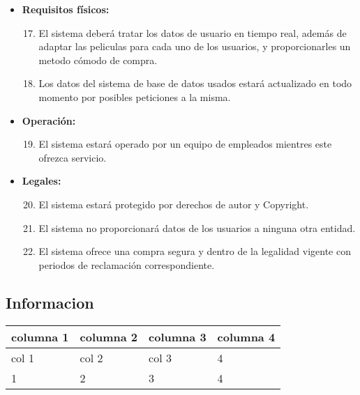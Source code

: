 \documentclass{article}
\begin{document}
\begin{itemize}
    \item \textbf{Requisitos físicos:}
        \begin{enumerate}[label=\bfseries RN- \arabic*:]
        \setcounter{enumi}{16}
        \item El sistema deberá tratar los datos de usuario en tiempo real, además de adaptar las peliculas para cada uno de los usuarios, y proporcionarles un metodo cómodo de compra.
        \item Los datos del sistema de base de datos usados estará actualizado en todo momento por posibles peticiones a la misma.
        \end{enumerate}
        
    \item \textbf{Operación:}
        \begin{enumerate}[label=\bfseries RN- \arabic*:]
        \setcounter{enumi}{18}
        \item El sistema estará operado por un equipo de empleados mientres este ofrezca servicio.
        \end{enumerate}
        
    \item \textbf{Legales:}
        \begin{enumerate}[label=\bfseries RN- \arabic*:]
        \setcounter{enumi}{19}
        \item El sistema estará protegido por derechos de autor y Copyright.
        \item El sistema no proporcionará datos de los usuarios a ninguna otra entidad.
        \item El sistema ofrece una compra segura y dentro de la legalidad vigente con periodos de reclamación correspondiente.
        \end{enumerate}
    \end{itemize}
    \subsection{Informacion}




\begin{tabular}{||l | l | l | l ||}
\hline
\hline
columna 1 & columna 2 & columna 3 & columna 4\\
\hline
col 1 & col 2 & col 3 & 4\\
\hline
1 & 2 & 3 & 4\\
\hline
\hline
\end{tabular}
\end{document}
